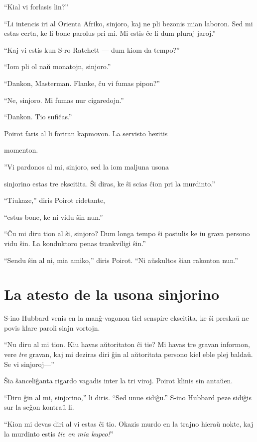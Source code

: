 ``Kial vi forlasis lin?''

``Li intencis iri al Orienta Afriko, sinjoro, kaj ne pli bezonis mian laboron. Sed mi estas certa, ke li bone parolus pri mi. Mi estis ĉe li dum pluraj jaroj.''

``Kaj vi estis kun S-ro Ratchett --- dum kiom da tempo?''

``Iom pli ol naŭ monatojn, sinjoro.''

``Dankon, Masterman. Flanke, ĉu vi fumas pipon?''

``Ne, sinjoro. Mi fumas nur cigaredojn.''

``Dankon. Tio sufiĉas.''

Poirot faris al li foriran kapmovon. La servisto hezitis

momenton.

''Vi pardonos al mi, sinjoro, sed la iom maljuna usona

sinjorino estas tre ekscitita. Ŝi diras, ke ŝi scias ĉion pri la murdinto.''

``Tiukaze,'' diris Poirot ridetante,

``estus bone, ke ni vidu ŝin nun.''

``Ĉu mi diru tion al ŝi, sinjoro? Dum longa tempo ŝi postulis ke iu grava persono vidu ŝin. La konduktoro penas trankviligi ŝin.''

``Sendu ŝin al ni, mia amiko,'' diris Poirot. ``Ni aŭskultos ŝian rakonton nun.''

\chapter[La atesto de la usona sinjorino]{La atesto de la usona sinjorino}


S-ino Hubbard venis en la manĝ-vagonon tiel senspire ekscitita, ke ŝi preskaŭ ne povis klare paroli siajn vortojn.

``Nu diru al mi tion. Kiu havas aŭtoritaton ĉi tie? Mi havas tre gravan informon, vere \emph{tre} gravan, kaj mi deziras diri ĝin al aŭtoritata persono kiel eble plej baldaŭ. Se vi sinjoroj---''

Ŝia ŝanceliĝanta rigardo vagadis inter la tri viroj. Poirot klinis sin antaŭen.

``Diru ĝin al mi, sinjorino,'' li diris. ``Sed unue sidiĝu.'' S-ino Hubbard peze sidiĝis sur la seĝon kontraŭ li.

``Kion mi devas diri al vi estas ĉi tio. Okazis murdo en la trajno hieraŭ nokte, kaj la murdinto estis \emph{tie en mia kupeo!}''

